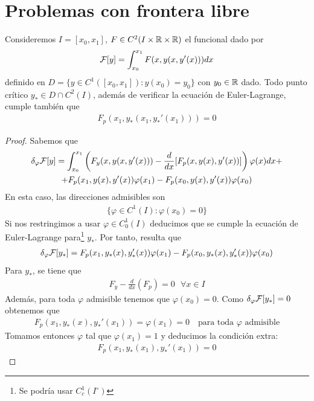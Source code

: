 \section{Problemas con frontera libre}

\begin{teo}
    Consideremos $I=[x_0, x_1]$, $F\in C^2(I\times \mathbb{R} \times \mathbb{R})$ el funcional dado por 
    \begin{gather*}
        \mathcal{F}[y] = \int_{x_0}^{x_1} F(x,y(x, y'(x))) dx
    \end{gather*}
    definido en $D = \{y\in C^1([x_0, x_1]) : y(x_0) = y_0\}$ con $y_0\in \mathbb{R}$ dado. Todo punto crítico $y_*\in D\cap C^2(I)$, además de verificar la ecuación de Euler-Lagrange, cumple también que 
    \begin{gather*}
        F_p(x_1, y_*(x_1, y_*'(x_1))) = 0
    \end{gather*} 
    \begin{proof}
        Sabemos que
        \begin{gather*}
            \delta_\varphi \mathcal{F}[y] = \int_{x_0}^{x_1} \left(F_y(x,y(x, y'(x))) -\frac{d}{dx}[F_p(x,y(x), y'(x))]\right)\varphi(x) dx +\\
            + F_p(x_1, y(x), y'(x))\varphi(x_1) - F_p(x_0, y(x), y'(x))\varphi(x_0)
        \end{gather*}
        En esta caso, las direcciones admisibles son
        \begin{gather*}
            \{\varphi \in C^1(I) : \varphi(x_0)=0\}
        \end{gather*}
        Si nos restringimos a usar $\varphi\in C_0^1(I)$ deducimos que se cumple la ecuación de Euler-Lagrange para\footnote{Se podría usar $C_c^1(I^\circ)$} $y_*$. Por tanto, resulta que 
        \begin{gather*}
            \delta_\varphi \mathcal{F}[y_*] = F_p(x_1, y_*(x), y_*'(x))\varphi(x_1) - F_p(x_0, y_*(x), y_*'(x))\varphi(x_0)
        \end{gather*}
        Para $y_*$, se tiene que 
        \begin{gather*}
            F_y - \frac{d}{dx}(F_p) = 0 \ \ \ \forall x \in I
        \end{gather*}
        Además, para toda $\varphi$ admisible tenemos que $\varphi(x_0)=0$. Como $\delta_\varphi\mathcal{F}[y_*] = 0$ obtenemos que 
        \begin{gather*}
            F_p(x_1, y_*(x), y_*'(x_1)) = \varphi(x_1) = 0 \ \ \ \text{ para toda $\varphi$ admisible}
        \end{gather*}
        Tomamos entonces $\varphi$ tal que $\varphi(x_1)=1$ y deducimos la condición extra:
        \begin{gather*}
            F_p(x_1, y_*(x_1), y_*'(x_1)) = 0
        \end{gather*}
    \end{proof}
\end{teo}

